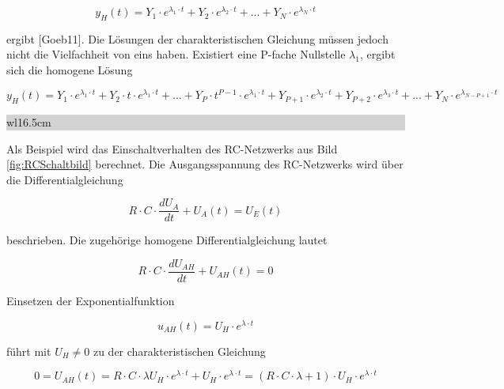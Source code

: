 \begin{equation}\label{eq:sixtyfive}
y_{H} \left(t\right)=Y_{1} \cdot e^{\lambda _{1} \cdot t} +Y_{2} \cdot e^{\lambda _{2} \cdot t} +...+Y_{N} \cdot e^{\lambda _{N} \cdot t} 
\end{equation}

\noindent ergibt [Goeb11]. Die Lösungen der charakteristischen Gleichung müssen jedoch nicht die Vielfachheit von eins haben. Existiert eine P-fache Nullstelle $\lambda _{1}$, ergibt sich die homogene Lösung

\begin{equation}\label{eq:sixtysix}
y_{H} \left(t\right)=Y_{1} \cdot e^{\lambda _{1} \cdot t} +Y_{2} \cdot t\cdot e^{\lambda _{1} \cdot t} +...+Y_{P} \cdot t^{P-1} \cdot e^{\lambda _{1} \cdot t} +Y_{P+1} \cdot e^{\lambda _{2} \cdot t} +Y_{P+2} \cdot e^{\lambda _{3} \cdot t} +...+Y_{N} \cdot e^{\lambda _{N-P+1} \cdot t}
\end{equation}

\noindent
\colorbox{lightgray}{%
%
\renewcommand\arraystretch{0.6}%
\begin{tabular}{ wl{16.5cm} }
{} 
\end{tabular}%
}\bigskip

\noindent Als Beispiel wird das Einschaltverhalten des RC-Netzwerks aus Bild \ref{fig:RCSchaltbild} berechnet. Die Ausgangsspannung des RC-Netzwerks wird über die Differentialgleichung

\begin{equation}\label{eq:sixtyseven}
R \cdot C \cdot\frac{dU_{A}}{dt} + U_{A}(t) =U_{E}(t) 
\end{equation}

\noindent beschrieben. Die zugehörige homogene Differentialgleichung lautet

\begin{equation}\label{eq:sixtyeight}
R \cdot C \cdot\frac{dU_{AH}}{dt} + U_{AH}(t) =0
\end{equation}

\noindent Einsetzen der Exponentialfunktion

\begin{equation}\label{eq:sixtynine}
 u_{AH}(t)= U_{H} \cdot e^{\lambda \cdot t}
\end{equation}

\noindent führt mit $U_{H} \neq 0$ zu der charakteristischen Gleichung

\begin{equation}\label{eq:seventy}
 0=U_{AH}(t)= R \cdot C \cdot \lambda U_{H} \cdot e^{\lambda \cdot t}+U_{H} \cdot e^{\lambda \cdot t}= (R \cdot C \cdot \lambda +1)\cdot U_{H} \cdot e^{\lambda \cdot t}
\end{equation}

